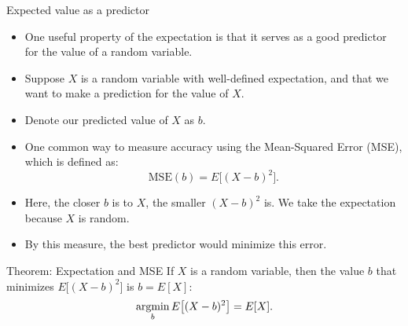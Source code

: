 \begin{frame}[allowframebreaks]{Expected value as a predictor}

\begin{itemize}
  \item One useful property of the expectation is that it serves as a good predictor for the value of a random variable. 
  \item Suppose $X$ is a random variable with well-defined expectation, and that we want to make a prediction for the value of $X$.
  \item Denote our predicted value of $X$ as $b$. 
  \item One common way to measure accuracy using the Mean-Squared Error (MSE), which is defined as:
  $$
  \text{MSE}(b) = E\big[(X - b)^2\big].
  $$
  \item Here, the closer $b$ is to $X$, the smaller $(X- b)^2$ is. We take the expectation because $X$ is random.
  \item By this measure, the best predictor would minimize this error.
\end{itemize}

\begin{block}{Theorem: Expectation and MSE}
  If $X$ is a random variable, then the value $b$ that minimizes $E\big[(X - b)^2\big]$ is $b = E[X]$:
  $$
  \mathop{\mathrm{argmin}}_b E\big[(X - b)^2\big] = E[X].
  $$
  

\end{block}
\end{frame}
